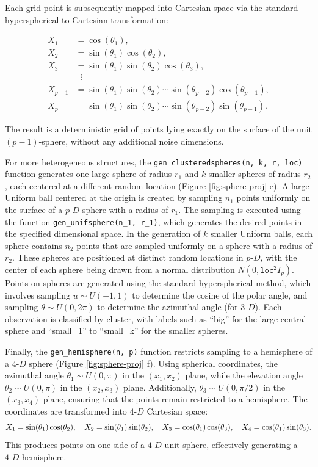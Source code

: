 Each grid point is subsequently mapped into Cartesian space via the standard hyperspherical-to-Cartesian transformation:

\[
\begin{aligned}
X_1 &= \cos(\theta_1), \\
X_2 &= \sin(\theta_1)\cos(\theta_2), \\
X_3 &= \sin(\theta_1)\sin(\theta_2)\cos(\theta_3), \\
&\;\;\vdots \\
X_{p-1} &= \sin(\theta_1)\sin(\theta_2)\cdots \sin(\theta_{p-2})\cos(\theta_{p-1}), \\
X_p &= \sin(\theta_1)\sin(\theta_2)\cdots \sin(\theta_{p-2})\sin(\theta_{p-1}).
\end{aligned}
\]

The result is a deterministic grid of points lying exactly on the surface of the unit \((p-1)\)-sphere, without any additional noise dimensions.

For more heterogeneous structures, the \texttt{gen\_clusteredspheres(n,\ k,\ r,\ loc)} function generates one large sphere of radius \(r_1\) and \(k\) smaller spheres of radius \(r_2\), each centered at a different random location (Figure \ref{fig:sphere-proj} e). A large Uniform ball centered at the origin is created by sampling \(n_1\) points uniformly on the surface of a \(p\text{-}D\) sphere with a radius of \(r_1\). The sampling is executed using the function \texttt{gen\_unifsphere(n\_1,\ r\_1)}, which generates the desired points in the specified dimensional space. In the generation of \(k\) smaller Uniform balls, each sphere contains \(n_2\) points that are sampled uniformly on a sphere with a radius of \(r_2\). These spheres are positioned at distinct random locations in \(p\text{-}D\), with the center of each sphere being drawn from a normal distribution \(N(0, \texttt{loc}^2 I_p)\). Points on spheres are generated using the standard hyperspherical method, which involves sampling \(u \sim U(-1, 1)\) to determine the cosine of the polar angle, and sampling \(\theta \sim U(0, 2\pi)\) to determine the azimuthal angle (for \(3\text{-}D\)). Each observation is classified by cluster, with labels such as ``big'' for the large central sphere and ``small\_1'' to ``small\_k'' for the smaller spheres.

Finally, the \texttt{gen\_hemisphere(n,\ p)} function restricts sampling to a hemisphere of a \(4\text{-}D\) sphere (Figure \ref{fig:sphere-proj} f). Using spherical coordinates, the azimuthal angle \(\theta_1 \sim U(0, \pi)\) in the \((x_1, x_2)\) plane, while the elevation angle \(\theta_2 \sim U(0, \pi)\) in the \((x_2, x_3)\) plane. Additionally, \(\theta_3 \sim U(0, \pi/2)\) in the \((x_3, x_4)\) plane, ensuring that the points remain restricted to a hemisphere. The coordinates are transformed into \(4\text{-}D\) Cartesian space: \[X_1 = \sin(\theta_1)\cos(\theta_2), \quad X_2 = \sin(\theta_1)\sin(\theta_2), \\\quad X_3 = \cos(\theta_1)\cos(\theta_3), \quad X_4 = \cos(\theta_1)\sin(\theta_3).\] This produces points on one side of a \(4\text{-}D\) unit sphere, effectively generating a \(4\text{-}D\) hemisphere.

